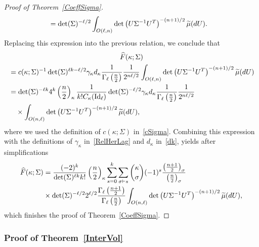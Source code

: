 \documentclass[AHL,Unicode,longabstracts,published]{cedram}
\DeclareMathOperator{\Id}{Id}
\let\oldtilde\tilde
\renewcommand*{\tilde}[1]{\mathchoice{\widetilde{#1}}{\widetilde{#1}}{\oldtilde{#1}}{\oldtilde{#1}}}
\begin{document}
\begin{proof}[Proof of Theorem~\ref{CoeffSigma}]
\begin{align*}
&= \det(\Sigma)^{-\ell/2} \int_{O(\ell,n)} \det\left(U\Sigma^{-1}U^T\right)^{-(n+1)/2} \tilde{\mu}(dU).
\end{align*}
Replacing this expression into the previous relation, we conclude that
\begin{multline*}
\widehat{F}(\kappa; \Sigma)\\
\begin{aligned}
&= c(\kappa;\Sigma)^{-1}\det(\Sigma)^{\ell k-\ell/2} \gamma_{\kappa} d_{\kappa} \frac{1}{\Gamma_{\ell}\left(\frac{n}{2}\right)}
\frac{1}{2^{n\ell/2}} \int_{O(\ell,n)} \det\left(U\Sigma^{-1}U^T\right)^{-(n+1)/2} \tilde{\mu}(dU) \\
&= \det(\Sigma)^{-\ell k}4^{k}
\left(\frac{n}{2}\right)_{\kappa} \frac{1}{ k !C_{\kappa}(\Id_{\ell})}
\det(\Sigma)^{-\ell/2} \gamma_{\kappa} d_{\kappa}
\frac{1}{\Gamma_{\ell}\left(\frac{n}{2}\right)}
\frac{1}{2^{n\ell/2}} \\
&\quad \times\int_{O(n,\ell)} \det\left(U\Sigma^{-1}U^T\right)^{-(n+1)/2} \tilde{\mu}(dU),
\end{aligned}
\end{multline*}
where we used the definition of $c(\kappa;\Sigma)$ in~\eqref{cSigma}. Combining this expression with the definitions of $\gamma_{\kappa}$ in~\eqref{RelHerLag} and $d_{\kappa}$ in~\eqref{dk}, yields after simplifications
\begin{align*}
\widehat{F}(\kappa; \Sigma) &= \frac{ (-2)^{k} }{\det(\Sigma)^{\ell k} k!}\left(\frac{n}{2}\right)_{\kappa}
\sum_{s=0}^{k} \sum_{\sigma\vdash s} \binom{\kappa}{\sigma} (-1)^s\frac{\left(\frac{n+1}{2}\right)_{\sigma}}{\left(\frac{n}{2}\right)_{\sigma}} \\
&\times
\det(\Sigma)^{-\ell/2} 2^{\ell/2} \frac{\Gamma_{\ell}\left(\frac{n+1}{2}\right)}{\Gamma_{\ell}\left(\frac{n}{2}\right)} \int_{O(n,\ell)} \det\left(U\Sigma^{-1}U^T\right)^{-(n+1)/2} \tilde{\mu}(dU),
\end{align*}
which finishes the proof of Theorem~\ref{CoeffSigma}.
\end{proof}



\subsubsection*{Proof of Theorem~\ref{InterVol}}
\end{document}
